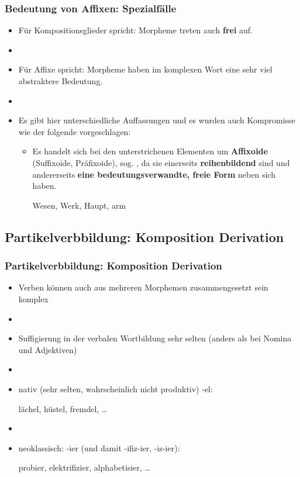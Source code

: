 \begin{frame}
\frametitle{Bedeutung von Affixen: Spezialfälle}

\begin{itemize}
	\item Für Kompositionsglieder spricht: Morpheme treten auch \textbf{frei} auf.
	\item[]
	\item Für Affixe spricht: Morpheme haben im komplexen Wort eine sehr viel abstraktere Bedeutung.
	\item[]
	\item Es gibt hier unterschiedliche Auffassungen und es wurden auch Kompromisse wie der folgende vorgeschlagen:
	
	\begin{itemize}
		\item Es handelt sich bei den unterstrichenen Elementen um \textbf{Affixoide} (Suffixoide, Präfixoide), sog. , da sie einerseits \textbf{reihenbildend} sind und andererseits \textbf{eine bedeutungsverwandte, freie Form} neben sich haben.
		
		\ea Wesen, Werk, Haupt, arm
		\z
		
	\end{itemize}
	
\end{itemize}


\end{frame}


\subsection{Partikelverbbildung: Komposition \vs Derivation}



\begin{frame}
\frametitle{Partikelverbbildung: Komposition \vs Derivation}

\begin{itemize}
	\item Verben können auch aus mehreren Morphemen zusammengesetzt sein \ras komplex 
	\item[]
	\item Suffigierung in der verbalen Wortbildung \ras sehr selten (anders als bei Nomina und Adjektiven)
	\item[]
	\item nativ (sehr selten, wahrscheinlich nicht produktiv) -el:
	
	\ea lächel, hüstel, fremdel, \dots
	\z

	\item[]
	\item neoklassisch: -ier (und damit -ifiz-ier, -is-ier):
	
	\ea probier, elektrifizier, alphabetisier, \dots 
	\z
	
\end{itemize}

\end{frame}



